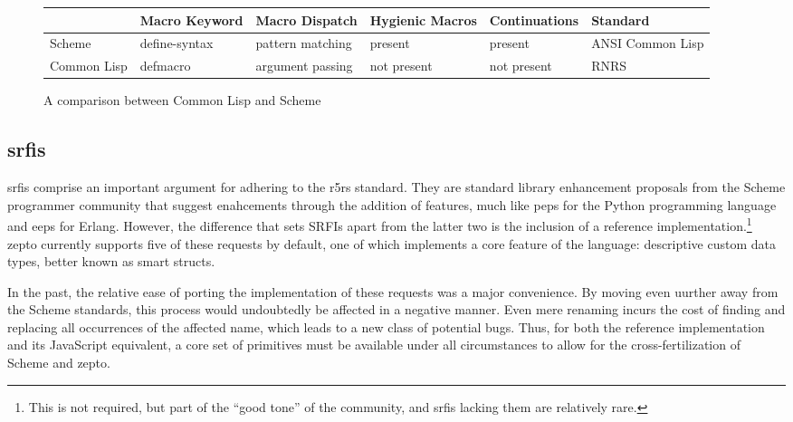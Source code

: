 \documentclass[oneside,11pt,xetex]{scrbook}
\begin{document}
\begin{center}
\begin{figure}
  \begin{tabu}{| l | l | l | l | l | l |}
  \hline
  \rowfont{\footnotesize}
              & Macro Keyword & Macro Dispatch   & Hygienic Macros & Continuations & Standard\\ \hline
  \rowfont{\footnotesize}
  Scheme      & define-syntax & pattern matching & present         & present       & ANSI Common Lisp\\ \hline
  \rowfont{\footnotesize}
  Common Lisp & defmacro      & argument passing & not present     & not present   & RNRS\\ \hline
  \end{tabu}
  \caption{A comparison between Common Lisp and Scheme}
\label{fig:lispcomp}
\end{figure}
\end{center}

\subsection{\glspl{srfi}}

\glspl{srfi} comprise an important argument for adhering to the \gls{r5rs} standard. They are
standard library enhancement proposals from the Scheme programmer community that suggest
enahcements through the addition of features, much like \glspl{pep} for the Python
programming language and \glspl{eep} for Erlang. However, the difference that sets SRFIs
apart from the latter two is the inclusion of a reference implementation.\footnote{This
is not required, but part of the ``good tone'' of the community, and \gls{srfi}s lacking them
are relatively rare.} zepto currently supports five of these requests by default,
one of which implements a core feature of the language: descriptive custom data types, better
known as smart structs.

In the past, the relative ease of porting the implementation of these requests was a major
convenience. By moving even uurther away from the Scheme standards, this process would
undoubtedly be affected in a negative manner. Even mere renaming incurs the cost of finding
and replacing all occurrences of the affected name, which leads to a new class of potential
bugs. Thus, for both the reference implementation and its
JavaScript equivalent, a core set of primitives must be available under all circumstances
to allow for the cross-fertilization of Scheme and zepto.
\end{document}
